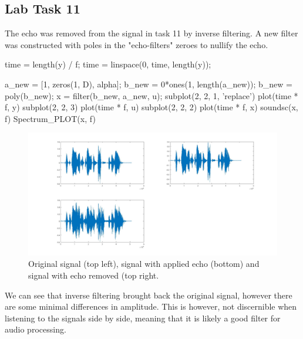 \documentclass[a4paper,11pt]{article}
\begin{document}
\subsection{Lab Task 11}
The echo was removed from the signal in task 11 by inverse filtering. A new filter was constructed with poles in the "echo-filters" zeroes to nullify the echo.  
\begin{ffcode}
time = length(y) / f;
time = linspace(0, time, length(y));

a_new = [1, zeros(1, D), alpha];
b_new = 0*ones(1, length(a_new));
b_new = poly(b_new);
x = filter(b_new, a_new, u);
subplot(2, 2, 1, 'replace')
plot(time * f, y)
subplot(2, 2, 3)
plot(time * f, u)
subplot(2, 2, 2)
plot(time * f, x)
soundsc(x, f)
Spectrum_PLOT(x, f)
\end{ffcode}

\begin{figure}[H]
    \hspace{-40pt}\includegraphics[scale=0.28]{./images/Task11.jpg}
    \caption{Original signal (top left), signal with applied echo (bottom) and signal with echo removed (top right.}
    \label{fig:my_label}
\end{figure}

We can see that inverse filtering brought back the original signal, however there are some minimal differences in amplitude. This is however, not discernible when listening to the signals side by side, meaning that it is likely a good filter for audio processing.
\end{document}
